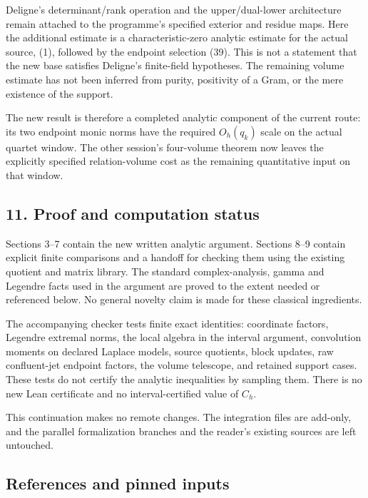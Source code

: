 Deligne's determinant/rank operation and the upper/dual-lower architecture remain attached to the programme's specified exterior and residue maps. Here the additional estimate is a characteristic-zero analytic estimate for the actual source, (1), followed by the endpoint selection (39). This is not a statement that the new base satisfies Deligne's finite-field hypotheses. The remaining volume estimate has not been inferred from purity, positivity of a Gram, or the mere existence of the support.

The new result is therefore a completed analytic component of the current route: its two endpoint monic norms have the required \(O_h(q_k)\) scale on the actual quartet window. The other session's four-volume theorem now leaves the explicitly specified relation-volume cost as the remaining quantitative input on that window.

\subsection{11. Proof and computation status}\label{zlm:endpoint-arithmetic_original--proof-and-computation-status}

Sections 3--7 contain the new written analytic argument. Sections 8--9 contain explicit finite comparisons and a handoff for checking them using the existing quotient and matrix library. The standard complex-analysis, gamma and Legendre facts used in the argument are proved to the extent needed or referenced below. No general novelty claim is made for these classical ingredients.

The accompanying checker tests finite exact identities: coordinate factors, Legendre extremal norms, the local algebra in the interval argument, convolution moments on declared Laplace models, source quotients, block updates, raw confluent-jet endpoint factors, the volume telescope, and retained support cases. These tests do not certify the analytic inequalities by sampling them. There is no new Lean certificate and no interval-certified value of \(C_h\).

This continuation makes no remote changes. The integration files are add-only, and the parallel formalization branches and the reader's existing sources are left untouched.

\subsection{References and pinned inputs}\label{zlm:endpoint-arithmetic_original--references-and-pinned-inputs}

